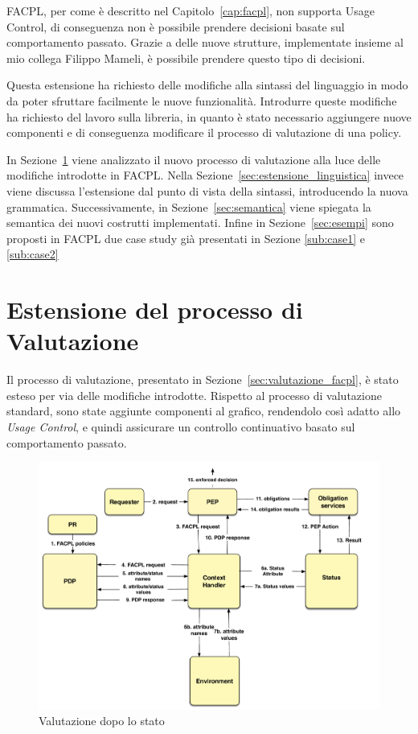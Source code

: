 \label{cap:usagecontrolfacpl}

\ac{FACPL}, per come è descritto nel Capitolo~\ref{cap:facpl}, non supporta Usage Control, di conseguenza non è possibile prendere decisioni basate sul comportamento passato. Grazie a delle nuove strutture, implementate insieme al mio collega Filippo Mameli, è possibile prendere questo tipo di decisioni.

Questa estensione ha richiesto delle modifiche alla sintassi del linguaggio in modo da poter sfruttare facilmente le nuove funzionalità. Introdurre queste modifiche ha richiesto del lavoro sulla libreria, in quanto è stato necessario aggiungere nuove componenti e di conseguenza modificare il processo di valutazione di una policy.

In Sezione~\ref{sec:estensione_del_processo_di_valutazione} viene analizzato il nuovo processo di valutazione alla luce delle modifiche introdotte in \ac{FACPL}.
Nella Sezione~\ref{sec:estensione_linguistica} invece viene discussa l'estensione dal punto di vista della sintassi, introducendo la nuova grammatica.
Successivamente, in Sezione~\ref{sec:semantica} viene spiegata la semantica dei nuovi costrutti implementati. Infine in Sezione~\ref{sec:esempi} sono proposti in \ac{FACPL} due case study già presentati in Sezione \ref{sub:case1} e \ref{sub:case2}

\section{Estensione del processo di Valutazione} %
\label{sec:estensione_del_processo_di_valutazione}
Il processo di valutazione, presentato in Sezione~\ref{sec:valutazione_facpl}, è stato esteso per via delle modifiche introdotte. 
Rispetto al processo di valutazione standard, sono state aggiunte
componenti al grafico, rendendolo così adatto allo \textit{Usage Control}, e quindi assicurare un controllo continuativo basato sul comportamento passato.
\begin{figure}[h]
 \centering 
	\includegraphics[scale = 0.5]{./Chapters/Image/evalvect.pdf}
 \caption{Valutazione dopo lo stato}
 \label{fig:evalStatus}
\end{figure}

